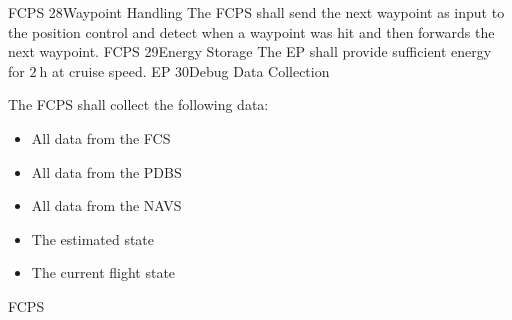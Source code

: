     {FCPS}
\req
    {28}{Waypoint Handling}
    {
        The FCPS shall send the next waypoint as input to the
        position control and detect when a waypoint was hit and
        then forwards the next waypoint.
    }
    {}
    {FCPS}
\req
    {29}{Energy Storage}
    {
        The EP shall provide sufficient energy for $\SI{2}{\hour}$
        at cruise speed.
    }
    {}
    {EP}
\req
    {30}{Debug Data Collection}
    {
        The FCPS shall collect the following data:
        \begin{itemize}
            \item All data from the FCS 
            \item All data from the PDBS
            \item All data from the NAVS
            \item The estimated state
            \item The current flight state
        \end{itemize}
    }
    {}
    {FCPS}